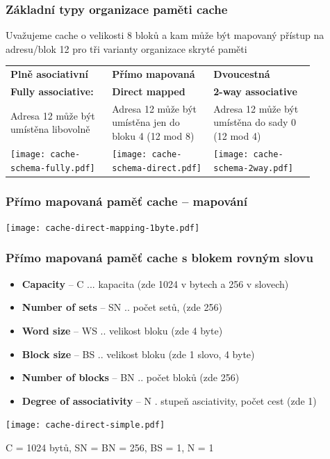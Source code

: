 \documentclass{beamer}
\begin{document}
\begin{frame}
\frametitle{Základní typy organizace paměti cache}

Uvažujeme cache o velikosti 8 bloků a kam může být mapovaný přístup na adresu/blok 12 pro tři varianty organizace skryté paměti

\begin{tabular}{p{0.29\linewidth}p{0.29\linewidth}p{0.29\linewidth}}
\textbf{Plně asociativní} & \textbf{Přímo mapovaná} & \textbf{Dvoucestná} \\
\textbf{Fully associative:} & \textbf{Direct mapped} & \textbf{2-way associative} \\
Adresa 12 může být umístěna libovolně &
Adresa 12 může být umístěna jen do bloku 4 (12 mod 8) &
Adresa 12 může být umístěna do sady 0 (12 mod 4) \\
\texttt{[image: cache-schema-fully.pdf]} &
\texttt{[image: cache-schema-direct.pdf]} &
\texttt{[image: cache-schema-2way.pdf]} \\
\end{tabular}

\end{frame}

\begin{frame}
\frametitle{Přímo mapovaná paměť cache -- mapování}

{
\centering

\texttt{[image: cache-direct-mapping-1byte.pdf]}

}

\end{frame}

\begin{frame}
\frametitle{Přímo mapovaná paměť cache s blokem rovným slovu}

\begin{itemize}
\item \textbf{Capacity} -- C ... kapacita (zde 1024 v bytech a 256 v slovech)
\item \textbf{Number of sets} -- SN .. počet setů, (zde 256)
\item \textbf{Word size} – WS .. velikost bloku (zde 4 byte)
\item \textbf{Block size} – BS .. velikost bloku (zde 1 slovo, 4 byte)
\item \textbf{Number of blocks} -- BN .. počet bloků (zde 256)
\item \textbf{Degree of associativity} -- N . stupeň asciativity, počet cest (zde 1)
\end{itemize}

{
\centering

\texttt{[image: cache-direct-simple.pdf]}

}

C = 1024 bytů, SN = BN = 256, BS = 1, N = 1

\end{frame}
\end{document}

